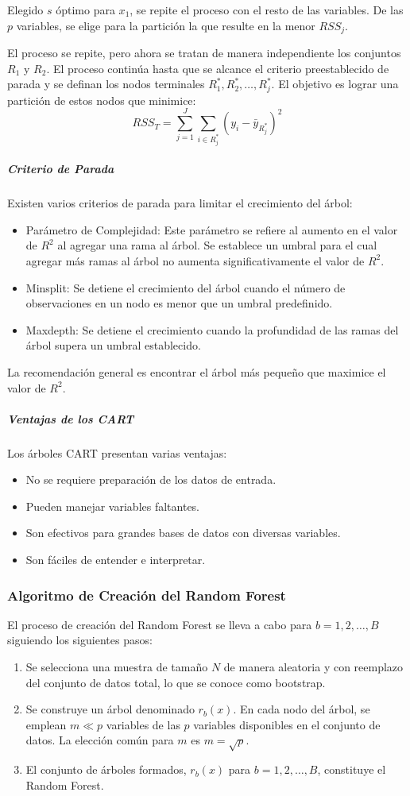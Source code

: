 Elegido \(s\) óptimo para \(x_1\), se repite el proceso con el resto de las variables. De las \(p\) variables, se elige para la partición la que resulte en la menor \(RSS_j\).

El proceso se repite, pero ahora se tratan de manera independiente los conjuntos \(R_1\) y \(R_2\). El proceso continúa hasta que se alcance el criterio preestablecido de parada y se definan los nodos terminales \(R_1^*, R_2^*, \ldots, R_j^*\). El objetivo es lograr una partición de estos nodos que minimice:
\[
RSS_T = \sum_{j=1}^{J} \sum_{i \in R_j^*} (y_i - \bar{y}_{R_j^*})^2
\]

\subparagraph{Criterio de Parada}
Existen varios criterios de parada para limitar el crecimiento del árbol:
\begin{itemize}
	\item Parámetro de Complejidad: Este parámetro se refiere al aumento en el valor de \(R^2\) al agregar una rama al árbol. Se establece un umbral para el cual agregar más ramas al árbol no aumenta significativamente el valor de \(R^2\).
	\item Minsplit: Se detiene el crecimiento del árbol cuando el número de observaciones en un nodo es menor que un umbral predefinido.
	\item Maxdepth: Se detiene el crecimiento cuando la profundidad de las ramas del árbol supera un umbral establecido.
\end{itemize}
La recomendación general es encontrar el árbol más pequeño que maximice el valor de \(R^2\).

\subparagraph{Ventajas de los CART}
Los árboles CART presentan varias ventajas:
\begin{itemize}
	\item No se requiere preparación de los datos de entrada.
	\item Pueden manejar variables faltantes.
	\item Son efectivos para grandes bases de datos con diversas variables.
	\item Son fáciles de entender e interpretar.
\end{itemize}

\subsubsection{Algoritmo de Creación del Random Forest}\label{sec:algoritmo-creacion-rf}

El proceso de creación del Random Forest se lleva a cabo para \(b = 1,2, \ldots, B\) siguiendo los siguientes pasos:
\begin{enumerate}
  \item Se selecciona una muestra de tamaño \(N\) de manera aleatoria y con reemplazo del conjunto de datos total, lo que se conoce como bootstrap.
  \item Se construye un árbol denominado \(r_b(x)\). En cada nodo del árbol, se emplean \(m \ll p\) variables de las \(p\) variables disponibles en el conjunto de datos. La elección común para \(m\) es \(m = \sqrt{p}\).
  \item El conjunto de árboles formados, \(r_b(x)\) para \(b = 1,2, \ldots, B\), constituye el Random Forest.
\end{enumerate}


